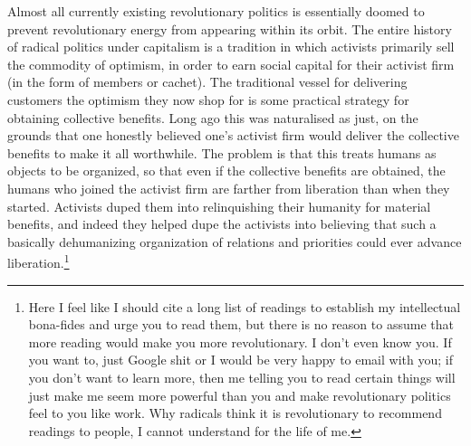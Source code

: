 \documentclass[a4paper,12pt,margin=.5in]{article}
\begin{document}
Almost all currently existing revolutionary politics is essentially
doomed to prevent revolutionary energy from appearing within its orbit.
The entire history of radical politics under capitalism is a tradition
in which activists primarily sell the commodity of optimism, in order to
earn social capital for their activist firm (in the form of members or
cachet). The traditional vessel for delivering customers the optimism
they now shop for is some practical strategy for obtaining collective
benefits. Long ago this was naturalised as just, on the grounds that one
honestly believed one's activist firm would deliver the collective
benefits to make it all worthwhile. The problem is that this treats
humans as objects to be organized, so that even if the collective
benefits are obtained, the humans who joined the activist firm are
farther from liberation than when they started. Activists duped them
into relinquishing their humanity for material benefits, and indeed they
helped dupe the activists into believing that such a basically
dehumanizing organization of relations and priorities could ever advance
liberation.\footnote{Here I feel like I should cite a long list of
  readings to establish my intellectual bona-fides and urge you to read
  them, but there is no reason to assume that more reading would make
  you more revolutionary. I don't even know you. If you want to, just
  Google shit or I would be very happy to email with you; if you don't
  want to learn more, then me telling you to read certain things will
  just make me seem more powerful than you and make revolutionary
  politics feel to you like work. Why radicals think it is revolutionary
  to recommend readings to people, I cannot understand for the life of
  me.}
\end{document}

